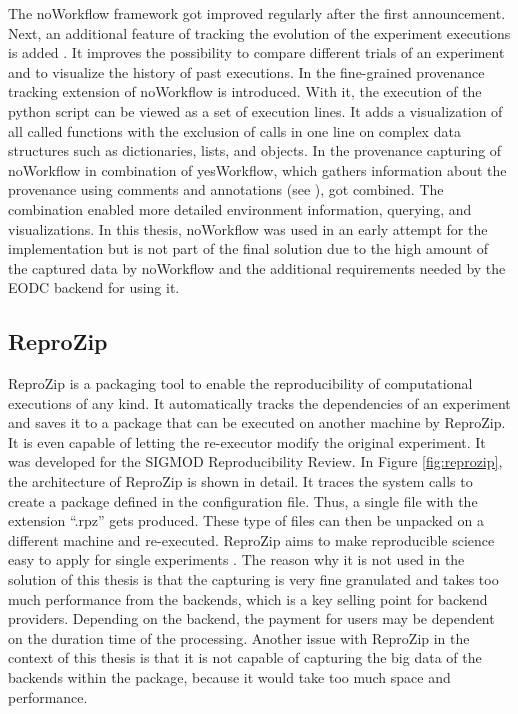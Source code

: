 \documentclass[draft,final]{vutinfth} %
\begin{document}
The noWorkflow framework got improved regularly after the first announcement. Next, an additional feature of tracking the evolution of the experiment executions is added \cite{Pimentel2016TrackingAA}. It improves the possibility to compare different trials of an experiment and to visualize the history of past executions. In \cite{Pimentel:2016:FPC:3090188.3090214} the fine-grained provenance tracking extension of noWorkflow is introduced. With it, the execution of the python script can be viewed as a set of execution lines. It adds a visualization of all called functions with the exclusion of calls in one line on complex data structures such as dictionaries, lists, and objects. In \cite{69bac1252a684629baa43b48e350068d} the provenance capturing of noWorkflow in combination of yesWorkflow, which gathers information about the provenance using comments and annotations (see \cite{192094}), got combined. The combination enabled more detailed environment information, querying, and visualizations. 
In this thesis, noWorkflow was used in an early attempt for the implementation but is not part of the final solution due to the high amount of the captured data by noWorkflow and the additional requirements needed by the EODC backend for using it.

\subsection{ReproZip}\label{ReproZip}
ReproZip is a packaging tool to enable the reproducibility of computational executions of any kind. It automatically tracks the dependencies of an experiment and saves it to a package that can be executed on another machine by ReproZip. It is even capable of letting the re-executor modify the original experiment. It was developed for the SIGMOD Reproducibility Review. In Figure \ref{fig:reprozip}, the architecture of ReproZip is shown in detail. It traces the system calls to create a package defined in the configuration file. Thus, a single file with the extension “.rpz” gets produced. These type of files can then be unpacked on a different machine and re-executed. ReproZip aims to make reproducible science easy to apply for single experiments \cite{29c5846926a4497d95f276604cb0368c}. The reason why it is not used in the solution of this thesis is that the capturing is very fine granulated and takes too much performance from the backends, which is a key selling point for backend providers. Depending on the backend, the payment for users may be dependent on the duration time of the processing. Another issue with ReproZip in the context of this thesis is that it is not capable of capturing the big data of the backends within the package, because it would take too much space and performance.   
\end{document}
